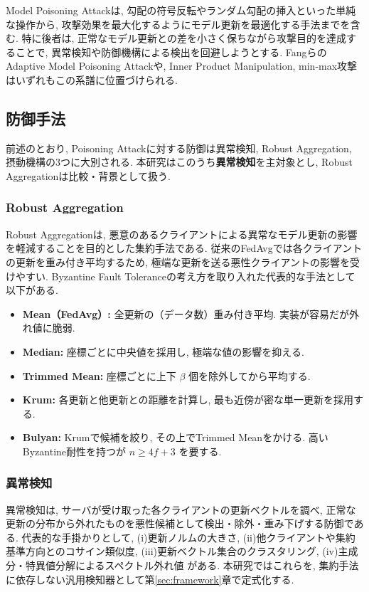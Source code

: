 \documentclass[a4j, twocolumn, dvipdfmx]{jsarticle}
\begin{document}
Model Poisoning Attackは, 勾配の符号反転やランダム勾配の挿入といった単純な操作から, 攻撃効果を最大化するようにモデル更新を最適化する手法までを含む. 特に後者は, 正常なモデル更新との差を小さく保ちながら攻撃目的を達成することで, 異常検知や防御機構による検出を回避しようとする\cite{bagdasaryan2020model}. Fangら\cite{fang2020local}のAdaptive Model Poisoning Attackや, Inner Product Manipulation\cite{xie2019fall}, min-max攻撃\cite{shejwalkar2021manipulating}はいずれもこの系譜に位置づけられる.

\subsection{防御手法}

前述のとおり, Poisoning Attackに対する防御は異常検知, Robust Aggregation, 摂動機構の3つに大別される\cite{sagar2023survey}. 本研究はこのうち\textbf{異常検知}を主対象とし, Robust Aggregationは比較・背景として扱う.

\subsubsection{Robust Aggregation}
Robust Aggregationは, 悪意のあるクライアントによる異常なモデル更新の影響を軽減することを目的とした集約手法である. 従来のFedAvgでは各クライアントの更新を重み付き平均するため, 極端な更新を送る悪性クライアントの影響を受けやすい. Byzantine Fault Toleranceの考え方を取り入れた代表的な手法として以下がある.

\begin{itemize}
  \item \textbf{Mean（FedAvg）:} 全更新の（データ数）重み付き平均. 実装が容易だが外れ値に脆弱.
  \item \textbf{Median\cite{yin2018byzantine}:} 座標ごとに中央値を採用し, 極端な値の影響を抑える.
  \item \textbf{Trimmed Mean\cite{yin2018byzantine}:} 座標ごとに上下 $\beta$ 個を除外してから平均する.
  \item \textbf{Krum\cite{blanchard2017krum}:} 各更新と他更新との距離を計算し, 最も近傍が密な単一更新を採用する.
  \item \textbf{Bulyan\cite{elmhamdi2018hidden}:} Krumで候補を絞り, その上でTrimmed Meanをかける. 高いByzantine耐性を持つが $n \geq 4f+3$ を要する.
\end{itemize}

\subsubsection{異常検知}
異常検知は, サーバが受け取った各クライアントの更新ベクトルを調べ, 正常な更新の分布から外れたものを悪性候補として検出・除外・重み下げする防御である. 代表的な手掛かりとして, (i)更新ノルムの大きさ\cite{nguyen2022flame}, (ii)他クライアントや集約基準方向とのコサイン類似度\cite{fung2020limitations}, (iii)更新ベクトル集合のクラスタリング\cite{shen2016auror,sattler2020byzantine}, (iv)主成分・特異値分解によるスペクトル外れ値\cite{tran2018spectral,shejwalkar2021manipulating} がある. 本研究ではこれらを, 集約手法に依存しない汎用検知器として第\ref{sec:framework}章で定式化する.
\end{document}
